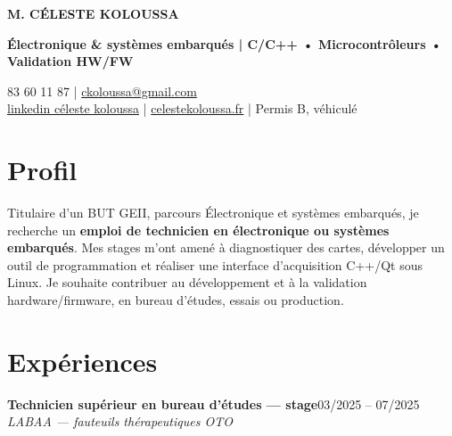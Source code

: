 \documentclass[10pt,a4paper]{article}
\newcommand{\poste}[3]{%
    \textbf{#1}\hfill #2\\
    \textit{#3}\par
}
\begin{document}

{\fontsize{25}{28}\selectfont
\bfseries\color{accent} M. CÉLESTE KOLOUSSA}\par
{\large\bfseries Électronique \& systèmes embarqués | C/C++ • Microcontrôleurs • Validation HW/FW }\par
\vspace{0.2cm}
 83 60 11 87
\enspace|\enspace
\href{mailto:ckoloussa@gmail.com}{ckoloussa@gmail.com}\\

\href{https://www.linkedin.com/in/c%C3%A9leste-koloussa-40b543177/}
{linkedin céleste koloussa}
\enspace|\enspace
\href{https://celestekoloussa.fr}{celestekoloussa.fr}
\enspace|\enspace
Permis B, véhiculé


\section{Profil}
\vspace{0.2cm}
Titulaire d'un BUT GEII, parcours Électronique et systèmes
embarqués, je recherche un \textbf{emploi de technicien en
électronique ou systèmes embarqués}. Mes stages m'ont amené
à diagnostiquer des cartes, développer un outil de programmation
et réaliser une interface d'acquisition C++/Qt sous Linux.
Je souhaite contribuer au développement et à la validation
hardware/firmware, en bureau d'études, essais ou production.


\section{Expériences}
\vspace{0.2cm}
\poste
{Technicien supérieur en bureau d'études --- stage}
{03/2025 -- 07/2025}
{LABAA --- fauteuils thérapeutiques OTO}
\end{document}
